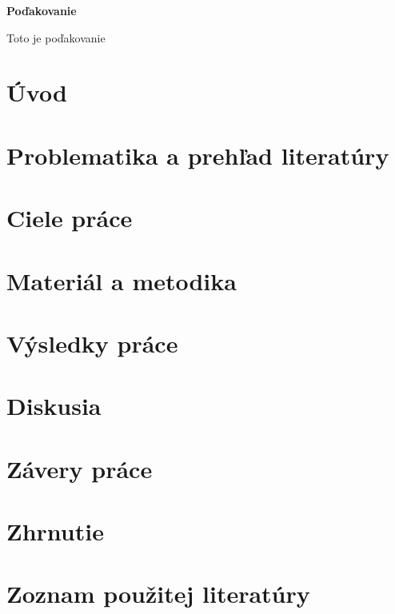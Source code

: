 \documentclass[12pt]{article}
\begin{document}
\newpage


%
%

\thispagestyle{empty}

\null
\vfill

\noindent
\textbf{Poďakovanie}

\noindent
Toto je poďakovanie

\vspace{8cm}
\newpage


%
%

\thispagestyle{empty}
\tableofcontents
\newpage


%
%

\section*{Úvod}

\section{Problematika a prehľad literatúry}
\section{Ciele práce}
\section{Materiál a metodika}
\section{Výsledky práce}
\section{Diskusia}
\section{Závery práce}
\section{Zhrnutie}
\section{Zoznam použitej literatúry}
\end{document}

